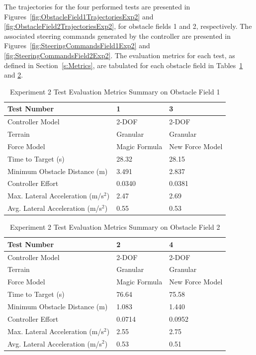 \documentclass[12pt,onecolumn]{report}
\begin{document}
The trajectories for the four performed tests are presented in Figures~\ref{fig:ObstacleField1TrajectoriesExp2} and \ref{fig:ObstacleField2TrajectoriesExp2}, for obstacle fields 1 and 2, respectively. The associated steering commands generated by the controller are presented in Figures~\ref{fig:SteeringCommandsField1Exp2} and \ref{fig:SteeringCommandsField2Exp2}. The evaluation metrics for each test, as defined in Section~\ref{s:Metrics}, are tabulated for each obstacle field in Tables~\ref{t:EvalMetricsObst1Exp2} and \ref{t:EvalMetricsObst2Exp2}. 

\begin{table}
		\centering
\begin{tabular}{ ||p{6cm}|p{3.5cm}|p{3.5cm}||  }
		\hline
		Test Number & 1 & 3 \\
		\hline
		Controller Model & 2-DOF & 2-DOF \\
		\hline
		Terrain & Granular & Granular\\
		\hline
		Force Model & Magic Formula & New Force Model\\
		\hline
		Time to Target (s)  & 28.32 & 28.15 \\ 
		\hline
		Minimum Obstacle Distance (m) & 3.491 & 2.837 \\
		\hline
		Controller Effort & 0.0340 & 0.0381 \\
		\hline
		Max. Lateral Acceleration (m/s$^{2}$)& 2.47 & 2.69 \\
		\hline
		Avg. Lateral Acceleration (m/s$^{2}$) & 0.55 & 0.53 \\
		\hline
\end{tabular}
\caption{Experiment 2 Test Evaluation Metrics Summary on Obstacle Field 1}
\label{t:EvalMetricsObst1Exp2}
\end{table}

\begin{table}
		\centering
\begin{tabular}{ ||p{6cm}|p{3.5cm}|p{3.5cm}||  }
		\hline
		Test Number & 2 & 4 \\
		\hline
		Controller Model & 2-DOF & 2-DOF \\
		\hline
		Terrain & Granular & Granular\\
		\hline
		Force Model & Magic Formula & New Force Model\\
		\hline
		Time to Target (s)  & 76.64 & 75.58 \\ 
		\hline
		Minimum Obstacle Distance (m) & 1.083 & 1.440 \\
		\hline
		Controller Effort & 0.0714 & 0.0952 \\
		\hline
		Max. Lateral Acceleration (m/s$^{2}$)& 2.55 & 2.75 \\
		\hline
		Avg. Lateral Acceleration (m/s$^{2}$) & 0.53 & 0.51 \\
		\hline
\end{tabular}
\caption{Experiment 2 Test Evaluation Metrics Summary on Obstacle Field 2}
\label{t:EvalMetricsObst2Exp2}
\end{table}
\end{document}
